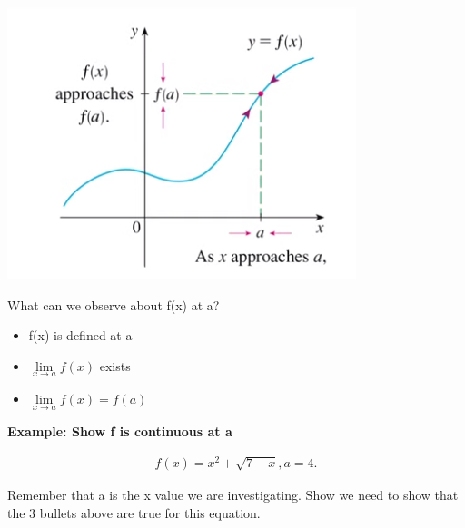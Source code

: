 \documentclass{report}
\begin{document}
        \bigbreak \noindent 
        \begin{center}
            \includegraphics[scale=0.8]{../images/observe.png }
        \end{center}

        \bigbreak \noindent 
        What can we observe about f(x) at a?
        
        \bigbreak \noindent 
        \begin{itemize}
            \item f(x) is defined at a
            \item $\lim\limits_{x \to a}{f \left(x\right)}$ exists 
            \item $\lim\limits_{x \to a}{f \left(x\right) = f \left(a\right)}$
        \end{itemize}

        \bigbreak \noindent \bigbreak \noindent 

        \bigbreak \noindent

        \pagebreak
        \noindent \textbf{Example: Show f is continuous at a}

        \begin{align*}
            f \left(x\right) = x^2 + \sqrt{7-x}, a = 4 
        .\end{align*}

        \bigbreak \noindent
        Remember that a is the x value we are investigating. Show we need to show that 
        the 3 bullets above are true for this equation. 
\end{document}
